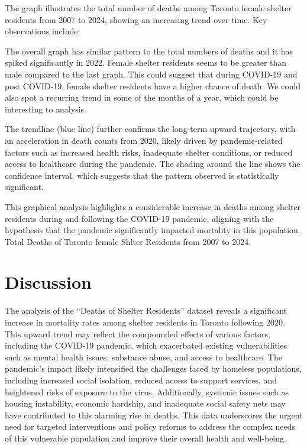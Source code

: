 \documentclass[
  letterpaper,
  DIV=11,
  numbers=noendperiod]{scrartcl}
\begin{document}
The graph illustrates the total number of deaths among Toronto female
shelter residents from 2007 to 2024, showing an increasing trend over
time. Key observations include:

The overall graph has similar pattern to the total numbers of deaths and
it has spiked significantly in 2022. Female shelter residents seems to
be greater than male compared to the last graph. This could suggest that
during COVID-19 and post COVID-19, female shelter residents have a
higher chance of death. We could also spot a recurring trend in some of
the months of a year, which could be interesting to analysis.

The trendline (blue line) further confirms the long-term upward
trajectory, with an acceleration in death counts from 2020, likely
driven by pandemic-related factors such as increased health risks,
inadequate shelter conditions, or reduced access to healthcare during
the pandemic. The shading around the line shows the confidence interval,
which suggests that the pattern observed is statistically significant.

This graphical analysis highlights a considerable increase in deaths
among shelter residents during and following the COVID-19 pandemic,
aligning with the hypothesis that the pandemic significantly impacted
mortality in this population. Total Deaths of Toronto female Shlter
Residents from 2007 to 2024.

\hypertarget{discussion}{%
\section{Discussion}\label{discussion}}

The analysis of the ``Deaths of Shelter Residents'' dataset reveals a
significant increase in mortality rates among shelter residents in
Toronto following 2020. This upward trend may reflect the compounded
effects of various factors, including the COVID-19 pandemic, which
exacerbated existing vulnerabilities such as mental health issues,
substance abuse, and access to healthcare. The pandemic's impact likely
intensified the challenges faced by homeless populations, including
increased social isolation, reduced access to support services, and
heightened risks of exposure to the virus. Additionally, systemic issues
such as housing instability, economic hardship, and inadequate social
safety nets may have contributed to this alarming rise in deaths. This
data underscores the urgent need for targeted interventions and policy
reforms to address the complex needs of this vulnerable population and
improve their overall health and well-being.
\end{document}
